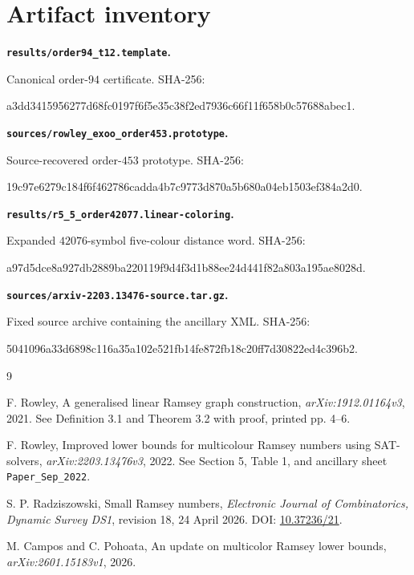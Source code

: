 \documentclass[11pt]{article}
\theoremstyle{definition}
\theoremstyle{remark}
\newcommand{\code}[1]{\texttt{#1}}
\newcommand{\hashbreak}[2]{{\ttfamily\scriptsize #1\linebreak #2}}
\begin{document}
\section{Artifact inventory}

\medskip\noindent\textbf{\code{results/order94\_t12.template}.}\par\nobreak
Canonical order-$94$ certificate.  SHA-256:
\begin{center}
\hashbreak{a3dd3415956277d68fc0197f6f5e35c3}
{8f2ed7936c66f11f658b0c57688abec1}.
\end{center}

\medskip\noindent\textbf{\code{sources/rowley\_exoo\_order453.prototype}.}\par\nobreak
Source-recovered order-$453$ prototype.  SHA-256:
\begin{center}
\hashbreak{19c97e6279c184f6f462786cadda4b7c}
{9773d870a5b680a04eb1503ef384a2d0}.
\end{center}

\medskip\noindent\textbf{\code{results/r5\_5\_order42077.linear-coloring}.}\par\nobreak
Expanded $42076$-symbol five-colour distance word.  SHA-256:
\begin{center}
\hashbreak{a97d5dce8a927db2889ba220119f9d4}
{f3d1b88ee24d441f82a803a195ae8028d}.
\end{center}

\medskip\noindent\textbf{\code{sources/arxiv-2203.13476-source.tar.gz}.}\par\nobreak
Fixed source archive containing the ancillary XML.  SHA-256:
\begin{center}
\hashbreak{5041096a33d6898c116a35a102e521fb}
{14fe872fb18c20ff7d30822ed4c396b2}.
\end{center}

\begin{thebibliography}{9}
\raggedright

F. Rowley,
\newblock A generalised linear Ramsey graph construction,
\newblock \emph{arXiv:1912.01164v3}, 2021.
\newblock See Definition 3.1 and Theorem 3.2 with proof, printed pp. 4--6.

F. Rowley,
\newblock Improved lower bounds for multicolour Ramsey numbers using
SAT-solvers,
\newblock \emph{arXiv:2203.13476v3}, 2022.
\newblock See Section 5, Table 1, and ancillary sheet
\code{Paper\_Sep\_2022}.

S. P. Radziszowski,
\newblock Small Ramsey numbers,
\newblock \emph{Electronic Journal of Combinatorics, Dynamic Survey DS1},
revision 18, 24 April 2026.
\newblock DOI: \href{https://doi.org/10.37236/21}{10.37236/21}.

M. Campos and C. Pohoata,
\newblock An update on multicolor Ramsey lower bounds,
\newblock \emph{arXiv:2601.15183v1}, 2026.

\end{thebibliography}
\end{document}
